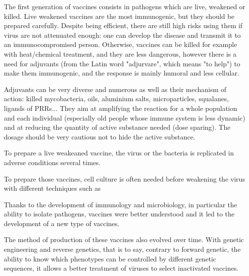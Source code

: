 \documentclass{article}
\begin{document}
            The first generation of vaccines consists in pathogens which are live, weakened or killed. Live weakened vaccines are the most immunogenic,
                but they should be prepared carefully. Despite being efficient, there are still high risks using them if virus are not attenuated enough:
                one can develop the disease and transmit it to an immunocompromised person. Otherwise, vaccines can be killed for example with heat/chemical treatment, and they
                are less dangerous, however there is a need for adjuvants (from the Latin word "adjurvare", which means "to help") 
                to make them immunogenic, and the response is mainly humoral and less cellular.

            Adjuvants can be very diverse and numerous as well as their mechanism of action: killed mycobacteria, oils, 
                aluminium salts, microparticles, squalanes, ligands of 
                PRRs... They aim at amplifying the reaction for a whole population and each individual (especially old people whose immune system is less dynamic) and 
                at reducing the quantity of active substance needed (dose sparing). The dosage should be very cautious not to hide the active substance.


            To prepare a live weakeaned vaccine, the virus or the bacteria is replicated in adverse conditions several times.




            To prepare those vaccines, cell culture is often needed before weakening the virus with different techniques such as 
            

            Thanks to the development of immunology and microbiology, in particular the ability to isolate pathogens, vaccines were better understood
                and it led to the development of a new type of vaccines.

            The method of production of these vaccines also evolved over time. With genetic engineering and reverse genetics, that is to say,  
                contrary to forward genetic, the ability to know which phenotypes can be controlled by different genetic sequences,
                it allows a better treatment of viruses to select inactivated vaccines.
\end{document}
